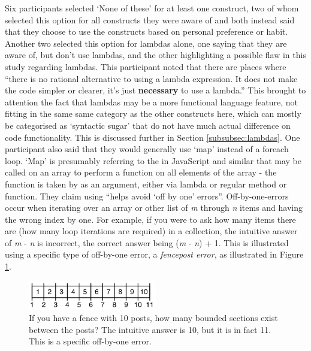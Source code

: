\documentclass{article}
\begin{document}
            Six participants selected `None of these' for at least one construct, two of whom selected this option for all constructs they were aware of and both instead said that they choose to use the constructs based on personal preference or habit. Another two selected this option for lambdas alone, one saying that they are aware of, but don't use lambdas, and the other highlighting a possible flaw in this study regarding lambdas. This participant noted that there are places where ``there is no rational alternative to using a lambda expression. It does not make the code simpler or clearer, it's just \textbf{necessary} to use a lambda.'' This brought to attention the fact that lambdas may be a more functional language feature, not fitting in the same same category as the other constructs here, which can mostly be categorised as `syntactic sugar' that do not have much actual difference on code functionality. This is discussed further in Section \ref{subsubsec:lambdas}.
            One participant also said that they would generally use `map' instead of a foreach loop. `Map' is presumably referring to the  in JavaScript and similar that may be called on an array to perform a function on all elements of the array - the function is taken by  as an argument, either via lambda or regular method or function. They claim using  ``helps avoid `off by one' errors''.  Off-by-one-errors occur when iterating over an array or other list of \textit{m} through \textit{n} items and having the wrong index by one. For example, if you were to ask how many items there are (how many loop iterations are required) in a collection, the intuitive answer of \textit{m} - \textit{n} is incorrect, the correct answer being (\textit{m} - \textit{n}) + 1. This is illustrated using a specific type of off-by-one error, a \textit{fencepost error}, as illustrated in Figure \ref{fig:fencepost}.
            \begin{figure}[htbp]
                \centering
                \includegraphics[width=0.5\textwidth]{fencepost}
                \caption{If you have a fence with 10 posts, how many bounded sections exist between the posts? The intuitive answer is 10, but it is in fact 11. This is a specific off-by-one error.}
                \label{fig:fencepost}
            \end{figure}
\end{document}
